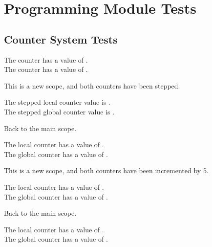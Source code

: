 \chapter{Programming Module Tests}

\section{Counter System Tests}

    The counter has a value of .\\
    The counter has a value of .

    {
    This is a new scope, and both counters  have been stepped.

    The stepped local  counter value is .\\
    The stepped global counter value is .
    }

    Back to the main scope.

    The local  counter has a value of .\\
    The global counter has a value of .
    
    {
    This is a new scope, and both counters have been incremented by 5.

    The local  counter has a value of .\\
    The global counter has a value of .
    }
    
    Back to the main scope.

    The local  counter has a value of .\\
    The global counter has a value of .
    


